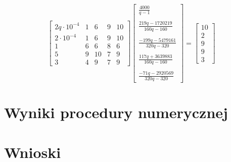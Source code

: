 \documentclass[a4paper]{article}
\begin{document}
$$
\left[
\begin{array}{ccccc}
2q\cdot 10^{-4} & 1&6&9&10\\
2\cdot 10^{-4}&1&6&9&10\\
1&6&6&8&6\\
5&9&10&7&9\\
3&4&9&7&9
\end{array}
\right]
\left[
\begin{array}
{c}
\frac{4000}{q-1}\\ \\
\frac{219q-1720219}{160q-160}\\ \\
\frac{-199q-5479161}{320q-320}\\ \\
\frac{117q+3639883}{160q-160}\\ \\
\frac{-71q-2920569}{320q-320}
\end{array}
\right]
=
\left[
\begin{array}
{c}
10\\
2\\
9\\
9\\
3
\end{array}
\right]
$$
\section{Wyniki procedury numerycznej}
\section{Wnioski}
\end{document}
